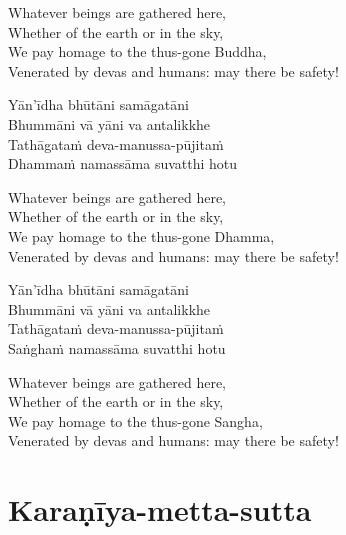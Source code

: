 \begin{english-verses}
  Whatever beings are gathered here,\\
  Whether of the earth or in the sky,\\
  We pay homage to the thus-gone Buddha,\\
  Venerated by devas and humans: may there be safety!
\end{english-verses}

\begin{pali-hang-continued}
  Yān'īdha bhūtāni samāgatāni\\
  Bhummāni vā yāni va antalikkhe\\
  Tathāgataṁ deva-manussa-pūjitaṁ\\
  Dhammaṁ namassāma suvatthi hotu
\end{pali-hang-continued}

\begin{english-verses}
  Whatever beings are gathered here,\\
  Whether of the earth or in the sky,\\
  We pay homage to the thus-gone Dhamma,\\
  Venerated by devas and humans: may there be safety!
\end{english-verses}

\begin{pali-hang-continued}
  Yān'īdha bhūtāni samāgatāni\\
  Bhummāni vā yāni va antalikkhe\\
  Tathāgataṁ deva-manussa-pūjitaṁ\\
  Saṅghaṁ namassāma suvatthi hotu
\end{pali-hang-continued}

\begin{english-verses}
  Whatever beings are gathered here,\\
  Whether of the earth or in the sky,\\
  We pay homage to the thus-gone Sangha,\\
  Venerated by devas and humans: may there be safety!
\end{english-verses}

\suttaRef{[Snp 2.1]}



\section{Karaṇīya-metta-sutta}
\label{karaniya-metta-sutta}


